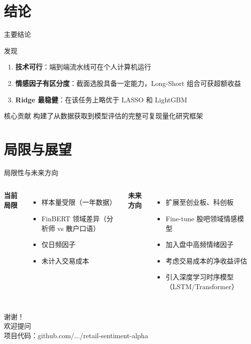 \documentclass[aspectratio=169,12pt]{ctexbeamer}
\begin{document}
\section{结论}

\begin{frame}{主要结论}
    \begin{block}{发现}
        \begin{enumerate}
            \item \textbf{技术可行}：端到端流水线可在个人计算机运行
            \item \textbf{情感因子有区分度}：截面选股具备一定能力，Long-Short 组合可获超额收益
            \item \textbf{Ridge 最稳健}：在该任务上略优于 LASSO 和 LightGBM
        \end{enumerate}
    \end{block}
    \vspace{0.3cm}
    \begin{alertblock}{核心贡献}
        构建了从数据获取到模型评估的完整可复现量化研究框架
    \end{alertblock}
\end{frame}

\section{局限与展望}

\begin{frame}{局限性与未来方向}
    \begin{columns}[T]
        \textbf{当前局限}
        \begin{itemize}
            \item 样本量受限（一年数据）
            \item FinBERT 领域差异（分析师 vs 散户口语）
            \item 仅日频因子
            \item 未计入交易成本
        \end{itemize}
        \textbf{未来方向}
        \begin{itemize}
            \item 扩展至创业板、科创板
            \item Fine-tune 股吧领域情感模型
            \item 加入盘中高频情绪因子
            \item 考虑交易成本的净收益评估
            \item 引入深度学习时序模型（LSTM/Transformer）
        \end{itemize}
    \end{columns}
\end{frame}

\begin{frame}[plain]
    \centering
    \vspace{2cm}
    {\Huge 谢谢！}\\[1cm]
    {\large 欢迎提问}\\[2cm]
    {\small 项目代码：github.com/.../retail-sentiment-alpha}
\end{frame}
\end{document}
